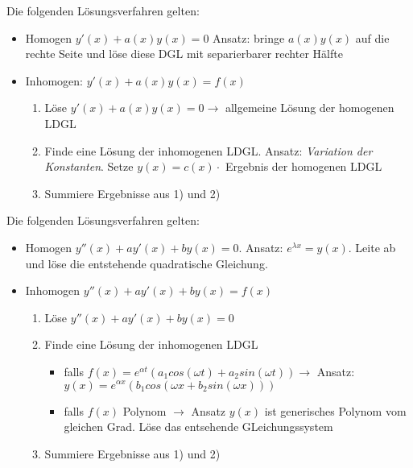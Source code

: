 \begin{satz}
	Die folgenden Lösungsverfahren gelten:
	\begin{itemize}
		\item Homogen $y'(x) + a(x)y(x) = 0$ Ansatz: bringe $a(x)y(x)$ auf die rechte Seite und löse diese DGL mit separierbarer rechter Hälfte
		\item Inhomogen: $y'(x) + a(x)y(x) = f(x)$ 
			\begin{enumerate} [noitemsep]
				\item Löse $y'(x) +a(x)y(x) = 0 \rightarrow $ allgemeine Lösung der homogenen LDGL
				\item Finde eine Lösung der inhomogenen LDGL. Ansatz: \emph{Variation der Konstanten}. Setze $y(x) = c(x) \cdot$ Ergebnis der homogenen LDGL
				\item Summiere Ergebnisse aus 1) und 2)
			\end{enumerate}
	\end{itemize}
\end{satz}

\begin{satz}
	Die folgenden Lösungsverfahren gelten:
	
	\begin{itemize}
		\item Homogen $y''(x) + a y'(x) + b y(x) = 0$. Ansatz: $e^{\lambda x} = y(x)$. Leite ab und löse die entstehende quadratische Gleichung.
		\item Inhomogen $y''(x) + a y'(x) + b y(x) = f(x) $
		\begin{enumerate} [noitemsep]
			\item Löse $y''(x) + a y'(x) + b y(x) = 0$
			\item Finde eine Lösung der inhomogenen LDGL 
			\begin{itemize}
				\item falls $f(x) = e^{\alpha t} (a_1 cos(\omega t) + a_2 sin(\omega t)) \rightarrow $ Ansatz: $y(x) = e^{\alpha x} (b_1 cos(\omega x + b_2 sin(\omega x)))$
				\item falls $f(x)$ Polynom $\rightarrow$ Ansatz $y(x)$ ist generisches Polynom vom gleichen Grad. Löse das entsehende GLeichungssystem
			\end{itemize}
			\item Summiere Ergebnisse aus 1) und 2)
		\end{enumerate}
	\end{itemize}
\end{satz}

